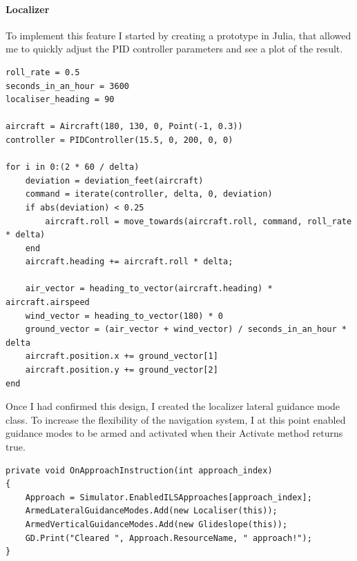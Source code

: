 \documentclass{article}
\begin{document}
\paragraph{Localizer}
To implement this feature I started by creating a prototype in Julia, that allowed me to quickly adjust the PID controller parameters and see a plot of the result.
\lstset{style=csharp, language=Julia}
\begin{lstlisting}[label={lst:pidlocsim}, caption=PID Localizer Simulation test script]
roll_rate = 0.5
seconds_in_an_hour = 3600
localiser_heading = 90

aircraft = Aircraft(180, 130, 0, Point(-1, 0.3))
controller = PIDController(15.5, 0, 200, 0, 0)

for i in 0:(2 * 60 / delta)
    deviation = deviation_feet(aircraft)
    command = iterate(controller, delta, 0, deviation)
    if abs(deviation) < 0.25
        aircraft.roll = move_towards(aircraft.roll, command, roll_rate * delta)
    end
    aircraft.heading += aircraft.roll * delta;

    air_vector = heading_to_vector(aircraft.heading) * aircraft.airspeed
    wind_vector = heading_to_vector(180) * 0
    ground_vector = (air_vector + wind_vector) / seconds_in_an_hour * delta
    aircraft.position.x += ground_vector[1]
    aircraft.position.y += ground_vector[2]
end
\end{lstlisting}
Once I had confirmed this design, I created the localizer lateral guidance mode class.
To increase the flexibility of the navigation system, I at this point enabled guidance modes to be armed and activated when their Activate method returns true.
\lstset{style=csharp}
\begin{lstlisting}[caption=Approach instruction receiver on Aeroplane class]
private void OnApproachInstruction(int approach_index)
{
    Approach = Simulator.EnabledILSApproaches[approach_index];
    ArmedLateralGuidanceModes.Add(new Localiser(this));
    ArmedVerticalGuidanceModes.Add(new Glideslope(this));
    GD.Print("Cleared ", Approach.ResourceName, " approach!");
}
\end{lstlisting}
\lstset{style=csharp}
\end{document}
